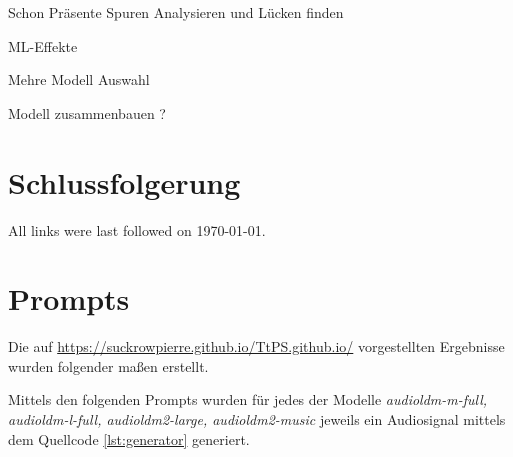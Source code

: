 \documentclass[
  a4paper,  %
  twoside,  %
  bibliography=totoc,
  headsepline,
  cleardoublepage=empty,
  parskip=half,
  draft=false
]{scrbook}
\begin{document}
Schon Präsente Spuren Analysieren und Lücken finden 

ML-Effekte

Mehre Modell Auswahl 

Modell zusammenbauen ? 





\chapter{Schlussfolgerung}
\label{sec:conclusion}


\printbibliography

All links were last followed on \today{}.

\appendix

\chapter{Prompts}
\label{chap:prompts}

Die auf \url{https://suckrowpierre.github.io/TtPS.github.io/}\cite{pierre-louis_suckrow_text-zu-spielbarem-klang_nodate} vorgestellten Ergebnisse wurden folgender maßen erstellt.

Mittels den folgenden Prompts wurden für jedes der Modelle \emph{audioldm-m-full, audioldm-l-full, audioldm2-large, audioldm2-music} \cite{liu_audioldm_2023,liu_audioldm2_2023} jeweils ein Audiosignal mittels dem Quellcode \ref{lst:generator}\cite{pierre-louis_suckrow_thesismodelsresultsgenerator_2023} generiert. 
\end{document}
